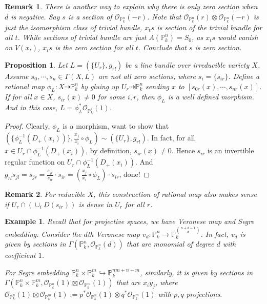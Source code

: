 \documentclass{ctexart}
\newtheorem{remark}{Remark}[section]
\newtheorem{proposition}{Proposition}[section]
\newtheorem{example}{Example}[section]
\begin{document}
\begin{remark}
    There is another way to explain why there is only zero section when $d$ is negative.
    Say $s$ is a section of $\mathcal{O}_{\mathbb{P}_{k}^{n}}(-r)$.
    Note that $\mathcal{O}_{\mathbb{P}_{k}^{n}}(r) \otimes \mathcal{O}_{\mathbb{P}_{k}^{n}}(-r)$ is just the isomorphism class of trivial bundle,
    $x_{t}s$ is section of the trivial bundle for all $t$.
    While sections of trivial bundle are just $A(\mathbb{P}_{k}^{n}) = S_{0}$, as $x_{t}s$ would vanish on $V(x_{t})$, $x_{t}s$ is the zero section for all $t$.
    Conclude that $s$ is zero section.
\end{remark}
\begin{proposition}
    Let $L = (\{U_{r}\}, g_{rl})$ be a line bundle over irreducible variety $X$.
    Assume $s_{0}, \cdots, s_{n}\in \Gamma(X, L)$ are not all zero sections, where $s_{i} = \{s_{ir}\}$.
    Define a rational map $\phi_{L}: X \dashrightarrow \mathbb{P}_{k}^{n}$ by gluing up $U_{r} \dashrightarrow \mathbb{P}_{k}^{n}$ sending $x$ to $[s_{0r}(x), \cdots, s_{nr}(x)]$.
    If for all $x\in X$, $s_{ir}(x) \neq 0$ for some $i, r$,
    then $\phi_{L}$ is a well defined morphism.
    And in this case, $L = \phi_{L}^{\ast}\mathcal{O}_{\mathbb{P}_{k}^{1}}(1)$.
    \label{Proposition 7.2}
\end{proposition}
\begin{proof}
    Clearly, $\phi_{L}$ is a morphism, want to show that $(\{\phi_{L}^{-1}(D_{+}(x_{i}))\}, \frac{x_{j}}{x_{i}} \circ \phi_{L}) \sim (\{U_{r}\}, g_{rl})$.
    In fact, for all $x\in U_{r} \cap \phi_{L}^{-1}(D_{+}(x_{i}))$, by definition, $s_{ir}(x) \neq 0$.
    Hence $s_{ir}$ is an invertible regular function on $U_{r} \cap \phi_{L}^{-1}(D_{+}(x_{i}))$.
    And $g_{rl}s_{jl} = s_{jr} = \frac{s_{jr}}{s_{ir}} \cdot s_{ir} = (\frac{x_{j}}{x_{i}} \circ \phi_{L}) \cdot s_{ir}$, done!
\end{proof}
\begin{remark}
    For reducible $X$, this construction of rational map also makes sense if $U_{r} \cap (\cup_{i} D(s_{ir}))$ is dense in $U_{r}$ for all $r$.
\end{remark}
\begin{example}
    Recall that for projective spaces, we have Veronese map and Segre embedding.
    Consider the $d$th Veronese map $v_{d}: \mathbb{P}_{k}^{n} \rightarrow \mathbb{P}_{k}^{\binom{n + d - 1}{d}}$.
    In fact, $v_{d}$ is given by sections in $\Gamma(\mathbb{P}_{k}^{n}, \mathcal{O}_{\mathbb{P}_{k}^{n}}(d))$ that are monomial of degree $d$ with coefficient $1$.
    \par
    For Segre embedding $\mathbb{P}_{k}^{n} \times \mathbb{P}_{k}^{m} \hookrightarrow \mathbb{P}_{k}^{nm + n + m}$,
    similarly, it is given by sections in $\Gamma(\mathbb{P}_{k}^{n} \times \mathbb{P}_{k}^{m}, \mathcal{O}_{\mathbb{P}_{k}^{n}}(1) \boxtimes \mathcal{O}_{\mathbb{P}_{k}^{m}}(1))$ that are $x_{i}y_{j}$,
    where $\mathcal{O}_{\mathbb{P}_{k}^{n}}(1) \boxtimes \mathcal{O}_{\mathbb{P}_{k}^{m}}(1) := p^{\ast}\mathcal{O}_{\mathbb{P}_{k}^{n}}(1) \otimes q^{\ast}\mathcal{O}_{\mathbb{P}_{k}^{m}}(1)$ with $p, q$ projections.
\end{example}
\end{document}
